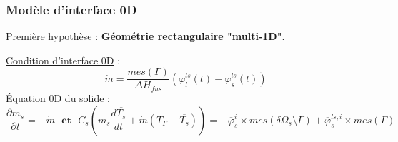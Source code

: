 \documentclass{beamer}
\renewcommand{\frac}{\dfrac}
\begin{document}
\begin{frame}
    \frametitle{Modèle d'interface 0D}
   \footnotesize
   \underline{Première hypothèse} : \textbf{Géométrie rectangulaire "multi-1D"}.\\
   \vspace{0.3cm}

 \color{cea_rouge} \underline{Condition d'interface 0D} : \color{cea_texte} $$ \dot{m} =  \frac{mes(\Gamma)}{\Delta H_{fus}} (\overline{\varphi}_l^{ls}(t) -\overline{\varphi}_s^{ls}(t))$$
\color{cea_rouge} \underline{Équation 0D du solide} : \color{cea_texte} $$ \frac{\partial m_s}{\partial t} = -\dot{m} \, \, \textbf{ et }  \, \, C_s (m_s \frac{d\overline{T_s}}{dt} + \dot{m} (T_{\Gamma} - \overline{T_s} )) = -\overline{\varphi}^i_s \times mes(\delta \Omega_s \setminus \Gamma)    + \overline{\varphi}^{ls, i}_s \times mes(\Gamma) $$


\end{frame}
\end{document}

